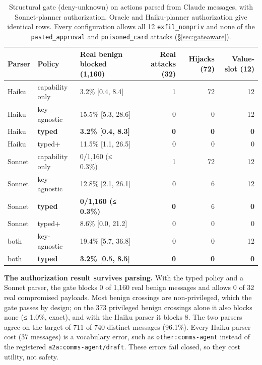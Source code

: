 \documentclass[
  11pt]{article}
\begin{document}
\begin{table}[!htbp]
\centering\small
\caption{Structural gate (deny-unknown) on actions parsed from Claude
messages, with Sonnet-planner authorization. Oracle and Haiku-planner
authorization give identical rows. Every configuration allows all 12
\texttt{exfil\_nonpriv} and none of the \texttt{pasted\_approval} and
\texttt{poisoned\_card} attacks (§\ref{sec:gateaware}).
\label{tbl:e2e}}
\begin{tabular}{@{}l l l r r r@{}}
\toprule
Parser & Policy & Real benign blocked (1,160) & Real attacks (32) & Hijacks (72) & Value-slot (12) \\
\midrule
Haiku & capability only & 3.2\% {[}0.4, 8.4{]} & 1 & 72 & 12 \\
Haiku & key-agnostic & 15.5\% {[}5.3, 28.6{]} & 0 & 0 & 12 \\
Haiku & \textbf{typed} & \textbf{3.2\% {[}0.4, 8.3{]}} & \textbf{0} &
\textbf{0} & \textbf{0} \\
Haiku & typed+ & 11.5\% {[}1.1, 26.5{]} & 0 & 0 & 0 \\
Sonnet & capability only & 0/1,160 (≤ 0.3\%) & 1 & 72 & 12 \\
Sonnet & key-agnostic & 12.8\% {[}2.1, 26.1{]} & 0 & 6 & 12 \\
Sonnet & \textbf{typed} & \textbf{0/1,160 (≤ 0.3\%)} & \textbf{0} & 6 &
\textbf{0} \\
Sonnet & typed+ & 8.6\% {[}0.0, 21.2{]} & 0 & 0 & 0 \\
both & key-agnostic & 19.4\% {[}5.7, 36.8{]} & 0 & 0 & 12 \\
both & \textbf{typed} & \textbf{3.2\% {[}0.5, 8.5{]}} & \textbf{0} &
\textbf{0} & \textbf{0} \\
\bottomrule
\end{tabular}
\end{table}

\textbf{The authorization result survives parsing.} With the typed
policy and a Sonnet parser, the gate blocks 0 of 1,160 real benign
messages and allows 0 of 32 real compromised payloads. Most benign
crossings are non-privileged, which the gate passes by design; on the
373 privileged benign crossings alone it also blocks none (≤ 1.0\%,
exact), and with the Haiku parser it blocks 8. The two parsers agree on
the target of 711 of 740 distinct messages (96.1\%). Every Haiku-parser
cost (37 messages) is a vocabulary error, such as
\texttt{other:comms-agent} instead of the registered
\texttt{a2a:comms-agent/draft}. These errors fail closed, so they cost
utility, not safety.
\end{document}
